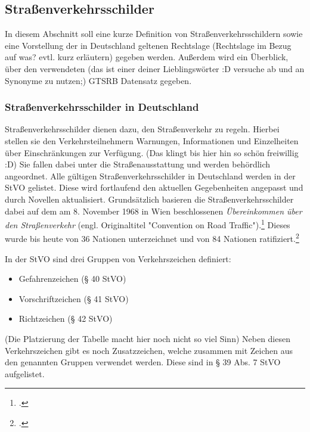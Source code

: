 \subsection{Straßenverkehrsschilder}
In diesem Abschnitt soll eine kurze Definition von Straßenverkehrsschildern sowie eine Vorstellung der in Deutschland geltenen Rechtslage (Rechtslage im Bezug auf was? evtl. kurz erläutern) gegeben werden. Außerdem wird ein Überblick, über den verwendeten (das ist einer deiner Lieblingswörter :D versuche ab und an Synonyme zu nutzen;) \ac{GTSRB} Datensatz gegeben.

\subsubsection{Straßenverkehrsschilder in Deutschland}
Straßenverkehrsschilder dienen dazu, den Straßenverkehr zu regeln. Hierbei stellen sie den Verkehrsteilnehmern Warnungen, Informationen und Einzelheiten über Einschränkungen zur Verfügung. (Das klingt bis hier hin so schön freiwillig :D) Sie fallen dabei unter die Straßenausstattung und werden behördlich angeordnet.  Alle gültigen Straßenverkehrsschilder in Deutschland werden in der \ac{StVO} gelistet. Diese wird fortlaufend den aktuellen Gegebenheiten angepasst und durch Novellen aktualisiert. Grundsätzlich basieren die Straßenverkehrsschilder dabei auf dem am 8. November 1968 in Wien beschlossenen \textit{Übereinkommen über den Straßenverkehr} (engl. Originaltitel "Convention on Road Traffic").\footcite[Vgl.][o.S.]{unConventionRoadTraffic1977} 
 Dieses wurde bis heute von 36 Nationen unterzeichnet und von 84 Nationen ratifiziert.\footcite[Vgl.][1-14]{unUnitedNationsTreaty2020}

In der \ac{StVO} sind drei Gruppen von Verkehrszeichen definiert:
\begin{itemize}
    \item Gefahrenzeichen (§ 40 \ac{StVO})
    \item Vorschriftzeichen (§ 41 \ac{StVO})
    \item Richtzeichen (§ 42 \ac{StVO})
\end{itemize}

(Die Platzierung der Tabelle macht hier noch nicht so viel Sinn) Neben diesen Verkehrszeichen gibt es noch Zusatzzeichen, welche zusammen mit Zeichen aus den genannten Gruppen verwendet werden. Diese sind in § 39 Abs. 7 \ac{StVO} aufgelistet.


